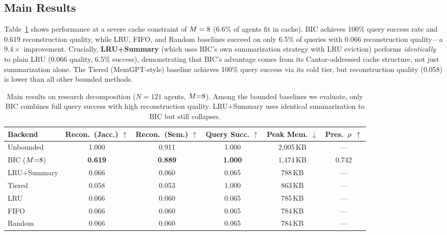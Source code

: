 \subsection{Main Results}
\label{sec:main-results}

Table~\ref{tab:main} shows performance at a severe cache constraint
of $M = 8$ (6.6\% of agents fit in cache).  BIC achieves
100\% query success rate and 0.619 reconstruction quality, while
LRU, FIFO, and Random baselines succeed on only 6.5\% of queries
with 0.066 reconstruction quality---a $9.4\times$ improvement.
Crucially, \textbf{LRU+Summary} (which uses BIC's own summarization
strategy with LRU eviction) performs \emph{identically} to plain LRU
(0.066 quality, 6.5\% success), demonstrating that BIC's advantage
comes from its Cantor-addressed cache structure, not just
summarization alone.  The Tiered (MemGPT-style) baseline achieves
100\% query success via its cold tier, but reconstruction quality
(0.058) is lower than all other bounded methods.

\begin{table}[t]
\centering
\caption{Main results on research decomposition ($N{=}121$ agents,
  $M{=}8$).  Among the bounded baselines we evaluate, only BIC
  combines full query success with high reconstruction quality.
  LRU+Summary uses identical summarization to BIC but still collapses.}
\label{tab:main}
\vspace{0.3em}
\begin{tabular}{lccccc}
\toprule
\textbf{Backend} & \textbf{Recon.\ (Jacc.)} $\uparrow$ &
\textbf{Recon.\ (Sem.)} $\uparrow$ &
\textbf{Query Succ.} $\uparrow$ &
\textbf{Peak Mem.} $\downarrow$ &
\textbf{Pres.\ $\rho$} $\uparrow$ \\
\midrule
Unbounded     & 1.000 & 0.911 & 1.000 & 2{,}005\,KB & --- \\
\midrule
BIC ($M{=}8$) & \textbf{0.619} & \textbf{0.889} & \textbf{1.000} & 1{,}474\,KB & 0.742 \\
LRU+Summary   & 0.066 & 0.060 & 0.065 & 788\,KB & --- \\
Tiered        & 0.058 & 0.053 & 1.000 & 863\,KB & --- \\
LRU           & 0.066 & 0.060 & 0.065 & 785\,KB & --- \\
FIFO          & 0.066 & 0.060 & 0.065 & 784\,KB & --- \\
Random        & 0.066 & 0.060 & 0.065 & 784\,KB & --- \\
\bottomrule
\end{tabular}
\end{table}

